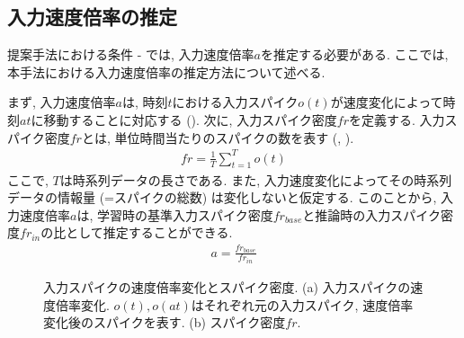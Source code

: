 \subsection{入力速度倍率の推定}
提案手法における条件 - では, 入力速度倍率$a$を推定する必要がある.
ここでは, 本手法における入力速度倍率の推定方法について述べる.

まず, 入力速度倍率$a$は, 時刻$t$における入力スパイク$o(t)$が速度変化によって時刻$at$に移動することに対応する ().
次に, 入力スパイク密度$fr$を定義する.
入力スパイク密度$fr$とは, 単位時間当たりのスパイクの数を表す (, ).
\begin{align}
    fr = \frac{1}{T} \sum_{t=1}^{T} o(t) \label{eq:input:spike:density}
\end{align}
ここで, $T$は時系列データの長さである.
また, 入力速度変化によってその時系列データの情報量 (=スパイクの総数) は変化しないと仮定する.
このことから, 入力速度倍率$a$は, 学習時の基準入力スパイク密度$fr_{base}$と推論時の入力スパイク密度$fr_{in}$の比として推定することができる.
\begin{align}
    a = \frac{fr_{base}}{fr_{in}}
\end{align}

\begin{figure}[htb]
    \centering

    \begin{minipage}{0.9\textwidth}
        \centering
        
        \label{fig:inspike:scaled}
    \end{minipage}

    \begin{minipage}{0.5\textwidth}
        \centering
        
        \label{fig:firingrate}
    \end{minipage}

    \caption[入力スパイクの速度倍率変化とスパイク密度]{
        入力スパイクの速度倍率変化とスパイク密度.
        (a) 入力スパイクの速度倍率変化.
        $o(t), o(at)$はそれぞれ元の入力スパイク, 速度倍率変化後のスパイクを表す. 
        (b) スパイク密度$fr$.
    }
\end{figure}